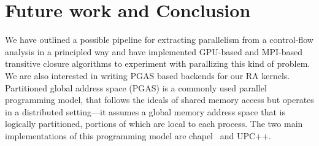 
\section{Future work and Conclusion}
We have outlined a possible pipeline for extracting parallelism from a control-flow analysis in a principled way and have implemented GPU-based
and MPI-based transitive closure algorithms to experiment with parallizing this kind of problem. 
We are also interested in writing PGAS based backends for our RA kernels.
Partitioned global address space (PGAS) is a commonly used parallel programming model, 
that follows the ideals of shared memory access but operates in a distributed setting---it assumes a
global memory address space that is logically partitioned, portions of which are local to each process. 
The two main implementations of this programming model are chapel~\cite{doi:10.1177/1094342007078442} and UPC++.%


